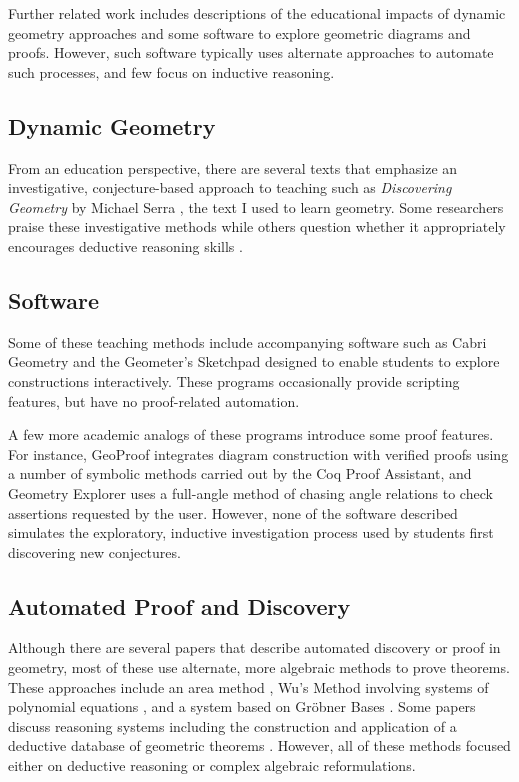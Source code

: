 \documentclass[10pt]{article}
\begin{document}
Further related work includes descriptions of the educational impacts
of dynamic geometry approaches and some software to explore geometric
diagrams and proofs.  However, such software typically uses alternate
approaches to automate such processes, and few focus on inductive
reasoning.

\subsection{Dynamic Geometry}
From an education perspective, there are several texts that emphasize
an investigative, conjecture-based approach to teaching such as
\emph{Discovering Geometry} by Michael Serra \cite{serraDiscovering},
the text I used to learn geometry.  Some researchers praise these
investigative methods \cite{geoTransformations} while others question
whether it appropriately encourages deductive reasoning skills
\cite{geoTeaching}.

\subsection{Software}
Some of these teaching methods include accompanying software such as
Cabri Geometry \cite{cabri} and the Geometer's Sketchpad
\cite{geoSketchpad} designed to enable students to explore
constructions interactively.  These programs occasionally provide
scripting features, but have no proof-related automation.

A few more academic analogs of these programs introduce some proof
features.  For instance, GeoProof \cite{geoProof} integrates diagram
construction with verified proofs using a number of symbolic methods
carried out by the Coq Proof Assistant, and Geometry Explorer
\cite{geoExplorer} uses a full-angle method of chasing angle relations
to check assertions requested by the user.  However, none of the
software described simulates the exploratory, inductive investigation
process used by students first discovering new conjectures.

\subsection{Automated Proof and Discovery}
Although there are several papers that describe automated discovery or
proof in geometry, most of these use alternate, more algebraic methods
to prove theorems.  These approaches include an area method
\cite{autoTools}, Wu's Method involving systems of polynomial
equations \cite{wuMethod}, and a system based on Gr\"obner Bases
\cite{grobner}.  Some papers discuss reasoning systems including the
construction and application of a deductive database of geometric
theorems \cite{deductiveDatabase}.  However, all of these methods
focused either on deductive reasoning or complex algebraic
reformulations.
\end{document}
